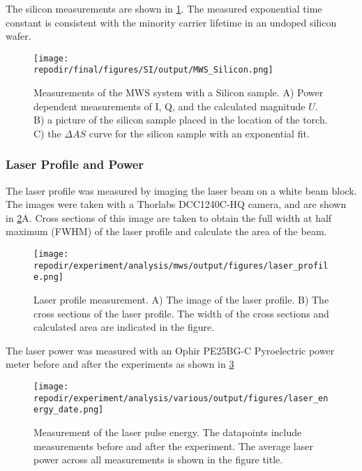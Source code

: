 The silicon measurements are shown in \ref{fig:SI_MWS_Silicon}. The measured exponential time constant is consistent with the minority carrier lifetime in an undoped silicon wafer. \cite{tyagiMINORITYCARRIERRECOMBINATION, delalamoModellingMinoritycarrierTransport1987} 

\begin{figure}[]
\centering
\texttt{[image: \\repodir/final/figures/SI/output/MWS\_Silicon.png]}
\caption{Measurements of the MWS system with a Silicon sample. A) Power dependent measurements of I, Q, and the calculated magnitude $U$. B) a picture of the silicon sample placed in the location of the torch. C) the $\Delta AS$ curve for the silicon sample with an exponential fit. }
\label{fig:SI_MWS_Silicon}
\end{figure}








\clearpage
\subsubsection{Laser Profile and Power}

The laser profile was measured by imaging the laser beam on a white beam block. The images were taken with a Thorlabs DCC1240C-HQ camera, and are shown in \ref{fig:SI_Laser_Profile}A. Cross sections of this image are taken to obtain the full width at half maximum (FWHM) of the laser profile and calculate the area of the beam.  

\begin{figure}[H]
\centering
\texttt{[image: \\repodir/experiment/analysis/mws/output/figures/laser\_profile.png]}
\caption{Laser profile measurement. A) The image of the laser profile. B) The cross sections of the laser profile. The width of the cross sections and calculated area are indicated in the figure.}
\label{fig:SI_Laser_Profile}
\end{figure}

The laser power was measured with an Ophir PE25BG-C Pyroelectric power meter before and after the experiments as shown in \ref{fig:SI_Laser_Energy} 



\begin{figure}[H]
\centering
\texttt{[image: \\repodir/experiment/analysis/various/output/figures/laser\_energy\_date.png]}
\caption{Measurement of the laser pulse energy. The datapoints include measurements before and after the experiment. The average laser power across all measurements is shown in the figure title. }
\label{fig:SI_Laser_Energy}
\end{figure}


